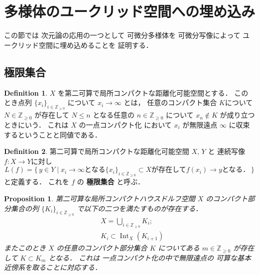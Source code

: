 \documentclass[leqno, a4paper, 12pt]{jsarticle}
\theoremstyle{plain}
\newtheorem{prop}[thm]{Proposition}
\theoremstyle{definition}
\newtheorem{df}{Definition}[section]
\theoremstyle{remark}
\newcommand{\zz}{\mathbb{Z}}
\DeclareMathOperator{\nai}{\mathrm{Int}}
\newcommand{\yoemph}[1]{\textbf{#1}}
\newcommand{\yolimset}[1]{L(#1)}
\numberwithin{equation}{section}
\begin{document}
\section{多様体のユークリッド空間への埋め込み}\label{sec:mfdembedding}
この節では
次元論の応用の一つとして
可微分多様体を
可微分写像によって
ユークリッド空間に埋め込めることを
証明する．

\subsection{極限集合}\label{subsec:limsets}

\begin{df}
$X$
を第二可算で局所コンパクトな距離化可能空間とする．
このとき点列
$\{x_{i}\}_{i\in \zz_{\ge 0}}$
について
$x_{i}\to \infty$
とは，
任意のコンパクト集合
$K$について
$N\in \zz_{\ge 0}$
が存在して
$N\le n$
となる任意の
$n\in \zz_{\ge 0}$
について
$x_{n}\not \in K$
が成り立つときにいう．
これは
$X$
の一点コンパクト化
において
$x_{i}$
が無限遠点
$\infty$
に収束するということと同値である．
\end{df}
\begin{df}
第二可算で局所コンパクトな距離化可能空間
$X$, 
$Y$
と
連続写像
$f\colon X\to Y$に対し
\[
\yolimset{f}=
\{\, y\in Y\mid \text{$x_i\to \infty$となる$\{x_{i}\}_{i\in \zz_{\ge 0}}\subset X$が存在して$f(x_{i})\to y$となる．}\, \}
\]
と定義する．
これを
$f$
の
\yoemph{極限集合}
と呼ぶ．
\end{df}

\begin{prop}\label{prop:sum:cpthemicpt0000}
第二可算な局所コンパクトハウスドルフ空間
$X$
のコンパクト部分集合の列
$\{K_{i}\}_{i\in \zz_{\ge 0}}$
で以下の二つを満たすものが存在する．
\begin{align}
& X=\bigcup_{i\in \zz_{\ge 0}}K_{i};\\
& K_{i}\subset \nai_X(K_{i+1})
\end{align}
またこのとき
$X$
の任意のコンパクト部分集合
$K$
についてある
$m\in \zz_{\ge 0}$
が存在して
$K\subset K_{m}$
となる．
これは
一点コンパクト化の中で無限遠点の
可算な基本近傍系を取ることに対応する．
\end{prop}
\end{document}
